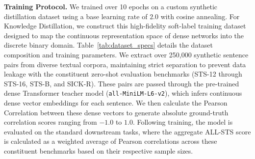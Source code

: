 \documentclass[10pt,a4paper,twoside]{article}
\begin{document}
\begin{table}[t!]
\begin{center}
{\caption{Hardware specifications for training and inference.}\label{tab:hardware_specs}}


\end{center}
\end{table}

\textbf{Training Protocol.} We trained over 10 epochs on a custom synthetic distillation dataset using a base learning rate of $2.0$ with cosine annealing. For Knowledge Distillation, we construct this high-fidelity soft-label training dataset designed to map the continuous representation space of dense networks into the discrete binary domain. Table~\ref{tab:dataset_specs} details the dataset composition and training parameters. We extract over 250,000 synthetic sentence pairs from diverse textual corpora, maintaining strict separation to prevent data leakage with the constituent zero-shot evaluation benchmarks (STS-12 through STS-16, STS-B, and SICK-R). These pairs are passed through the pre-trained dense Transformer teacher model (\texttt{all-MiniLM-L6-v2}), which infers continuous dense vector embeddings for each sentence. We then calculate the Pearson Correlation between these dense vectors to generate absolute ground-truth correlation scores ranging from $-1.0$ to $1.0$. Following training, the model is evaluated on the standard downstream tasks, where the aggregate ALL-STS score is calculated as a weighted average of Pearson correlations across these constituent benchmarks based on their respective sample sizes.
\end{document}
